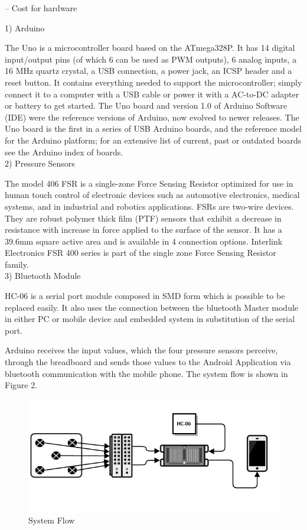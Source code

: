 \documentclass[conference]{IEEEtran}
\begin{document}
-- Cost for hardware

1)	Arduino

The Uno is a microcontroller board based on the ATmega328P. It has 14 digital input/output pins (of which 6 can be used as PWM outputs), 6 analog inputs, a 16 MHz quartz crystal, a USB connection, a power jack, an ICSP header and a reset button. It contains everything needed to support the microcontroller; simply connect it to a computer with a USB cable or power it with a AC-to-DC adapter or battery to get started. The Uno board and version 1.0 of Arduino Software (IDE) were the reference versions of Arduino, now evolved to newer releases. The Uno board is the first in a series of USB Arduino boards, and the reference model for the Arduino platform; for an extensive list of current, past or outdated boards see the Arduino index of boards.\\

2)	Pressure Sensors

The model 406 FSR is a single-zone Force Sensing Resistor optimized for use in human touch control of electronic devices such as automotive electronics, medical systems, and in industrial and robotics applications. FSRs are two-wire devices. They are robust polymer thick film (PTF) sensors that exhibit a decrease in resistance with increase in force applied to the surface of the sensor. It has a 39.6mm square active area and is available in 4 connection options. Interlink Electronics FSR 400 series is part of the single zone Force Sensing Resistor family.\\

3)	Bluetooth Module

HC-06 is a serial port module composed in SMD form which is possible to be replaced easily. It also uses the connection between the bluetooth Master module in either PC or mobile device and embedded system in substitution of the serial port. 

Arduino receives the input values, which the four pressure sensors perceive, through the breadboard and sends those values to the Android Application via bluetooth communication with the mobile phone. The system flow is shown in Figure 2.\\

\begin{figure}[H]
\begin{center}
    \includegraphics[scale=0.4]{img_01.png}
    \caption{System Flow} 
\end{center}
\end{figure}
\end{document}
